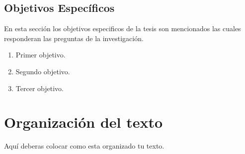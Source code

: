 \subsection{Objetivos Específicos}
En esta sección los objetivos especificos de la tesis son mencionados las cuales responderan las preguntas de la investigación.
 \begin{enumerate}
 	
	\item Primer objetivo.
	
	\item Segundo objetivo.
	
 	\item Tercer objetivo.
	
 \end{enumerate}


\section{Organización del texto}
Aquí deberas colocar como esta organizado tu texto.
